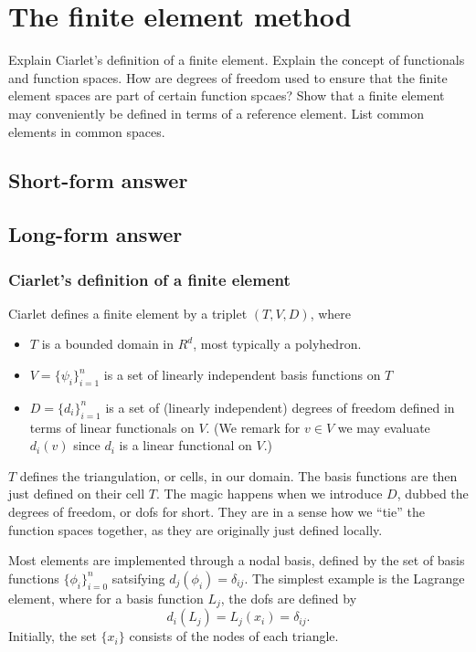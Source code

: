 \section{The finite element method}
Explain Ciarlet's definition of a finite element.
Explain the concept of functionals and function spaces.
How are degrees of freedom used to ensure that the finite element spaces are part of certain function spcaes?
Show that a finite element may conveniently be defined in terms of a reference element.
List common elements in common spaces.

\subsection{Short-form answer}


\subsection{Long-form answer}

\subsubsection{Ciarlet's definition of a finite element}
Ciarlet defines a finite element by a triplet $(T, V , D)$, where
\begin{itemize}
    \item
        $T$ is a bounded domain in $R^d$, most typically a polyhedron.

    \item
        $V = \{\psi_i\}_{i = 1}^n$ is a set of linearly independent basis functions on $T$

    \item
        $D = \{d_i\}_{i = 1}^n$ is a set of (linearly independent) degrees of freedom defined in terms of linear functionals on $V$.
        (We remark for $v \in V$ we may evaluate $d_i(v)$ since $d_i$ is a linear functional on $V$.)
\end{itemize}
$T$ defines the triangulation, or cells, in our domain.
The basis functions are then just defined on their cell $T$.
The magic happens when we introduce $D$, dubbed the degrees of freedom, or dofs for short.
They are in a sense how we ``tie'' the function spaces together, as they are originally just defined locally.

Most elements are implemented through a nodal basis, defined by the set of basis functions $\{\phi_i\}_{i = 0}^n$ satsifying $d_j(\phi_i) = \delta_{ij}$.
The simplest example is the Lagrange element, where for a basis function $L_j$, the dofs are defined by
\begin{equation}
    d_i(L_j) = L_j(x_i) = \delta_{ij}.
\end{equation}
Initially, the set $\{x_i\}$ consists of the nodes of each triangle.

